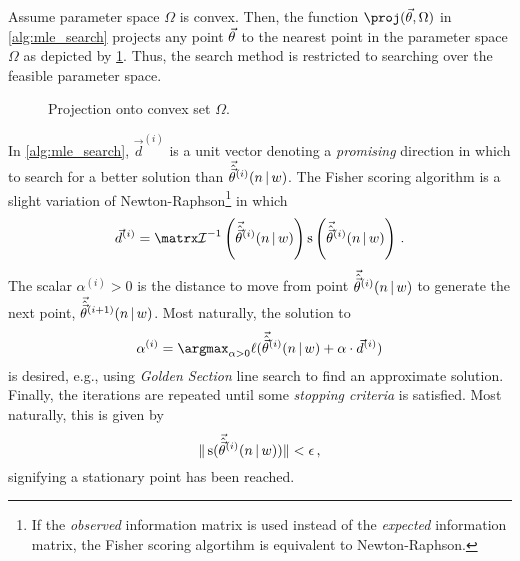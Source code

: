 \documentclass[../main.tex]{subfiles}
\begin{document}
Assume parameter space $\Omega$ is convex. Then, the function $\proj(\sysparamvec, \Omega)$ in \cref{alg:mle_search} projects any point $\vec{\theta}$ to the nearest point in the parameter space $\Omega$ as depicted by \cref{fig:convex_proj}. Thus, the search method is restricted to searching over the feasible parameter space.
\begin{figure}
    \caption{Projection onto convex set $\Omega$.}  
    \centering
    \label{fig:convex_proj}
\end{figure}

In \cref{alg:mle_search}, $\vec{d}^{(i)}$ is a unit vector denoting a \emph{promising} direction in which to search for a better solution than $\vec{\hat{\vec{\theta}}}^{(i)}(n {\,|\,} w)$. The Fisher scoring algorithm is a slight variation of Newton-Raphson\footnote{If the \emph{observed} information matrix is used instead of the \emph{expected} information matrix, the Fisher scoring algortihm is equivalent to Newton-Raphson.} in which
\begin{equation}
    \vec{d}^{(i)} = \infomatrx^{-1}\left(\mlei{i} \right) \score\left( \mlei{i} \right)\,.
\end{equation}
The scalar $\alpha^{(i)} > 0$ is the distance to move from point $\vec{\hat{\vec{\theta}}}^{(i)}(n {\,|\,} w)$ to generate the next point, $\vec{\hat{\vec{\theta}}}^{(i+1)}(n {\,|\,} w)$. Most naturally, the solution to
\begin{equation}
    \alpha^{(i)} = \argmax_{\alpha > 0} \ell(\mlei{i} + \alpha \cdot \vec{d}^{(i)})    
\end{equation}
is desired, e.g., using \emph{Golden Section} line search to find an approximate solution. Finally, the iterations are repeated until some \emph{stopping criteria} is satisfied. Most naturally, this is given by
\begin{equation}
    \| \operatorname{\rm{s}}(\vec{\hat{\vec{\theta}}}^{(i)}(n {\,|\,} w)) \| < \epsilon\,,
\end{equation}
signifying a stationary point has been reached.
\end{document}
